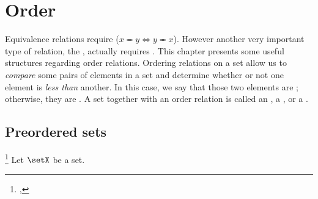 \chapter{Order}
\label{chp:order}
Equivalence relations 
require  ($x\eqcirc y\iff y\eqcirc x$).
However another very important type of relation,
the , actually requires .
This chapter presents some useful structures regarding order relations.
Ordering relations on a set allow us to \emph{compare} 
some pairs of elements in a set
and determine whether or not one element is \emph{less than} another.
In this case, we say that those two elements are ;
otherwise, they are .
A set together with an order relation is called an ,
a , or a  .

\section{Preordered sets}
\begin{definition}
\footnote{
  ,
  }
\label{def:preorder}
Let $\setX$ be a set.
\end{definition}

